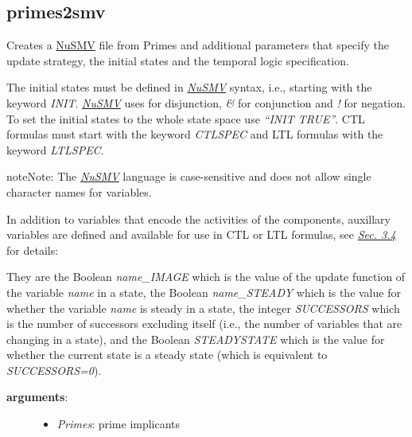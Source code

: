 \documentclass[letterpaper,10pt,english]{sphinxmanual}
\begin{document}
\subsection{primes2smv}
\label{ModelChecking:id8}\label{ModelChecking:primes2smv}

\begin{fulllineitems}
\label{ModelChecking:PyBoolNet.ModelChecking.primes2smv}
Creates a \href{http://nusmv.fbk.eu}{NuSMV} file from Primes and additional parameters that specify the update strategy, the initial states and the temporal logic specification.

The initial states must be defined in {\hyperref[Installation:installation-nusmv]{\emph{NuSMV}}} syntax, i.e.,
starting with the keyword \emph{INIT}.
{\hyperref[Installation:installation-nusmv]{\emph{NuSMV}}} uses \emph{\textbar{}} for disjunction, \emph{\&} for conjunction and \emph{!} for negation.
To set the initial states to the whole state space use \emph{``INIT TRUE''}.
CTL formulas must start with the keyword \emph{CTLSPEC} and LTL formulas with the keyword \emph{LTLSPEC}.

\begin{notice}{note}{Note:}
The {\hyperref[Installation:installation-nusmv]{\emph{NuSMV}}} language is case-sensitive and does not allow single character names for variables.
\end{notice}

In addition to variables that encode the activities of the components,
auxillary variables are defined and available for use in CTL or LTL formulas,
see {\hyperref[Manual:sec-model-checking]{\emph{Sec. 3.4}}} for details:

They are the Boolean \emph{name\_IMAGE} which is the value of the update function of the variable \emph{name} in a state,
the Boolean \emph{name\_STEADY} which is the value for whether the variable \emph{name} is steady in a state,
the integer \emph{SUCCESSORS} which is the number of successors excluding itself (i.e., the number of variables that are changing in a state), and
the Boolean \emph{STEADYSTATE} which is the value for whether the current state is a steady state (which is equivalent to \emph{SUCCESSORS=0}).
\begin{description}
\item[{\textbf{arguments}:}] \leavevmode\begin{itemize}
\item {} 
\emph{Primes}: prime implicants


\end{itemize}
\end{description}
\end{fulllineitems}
\end{document}
